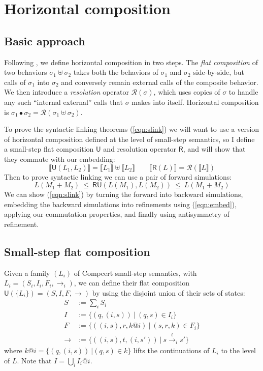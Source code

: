 \documentclass[11pt]{article}
\newcommand{\kw}[1]{{\mathsf{#1}}}
\begin{document}
\section{Horizontal composition}
\label{sec:hcomp}

\subsection{Basic approach}

Following \cite{cpp15},
we define horizontal composition in two steps.
The \emph{flat composition} of two behaviors $\sigma_1 \uplus \sigma_2$
takes both the behaviors of $\sigma_1$ and $\sigma_2$ side-by-side,
but calls of $\sigma_1$ into $\sigma_2$ and conversely remain
external calls of the composite behavior.
We then introduce a \emph{resolution} operator $\mathcal{R}(\sigma)$,
which uses copies of $\sigma$ to handle any such ``internal external'' calls
that $\sigma$ makes into itself.
Horizontal composition is
$\sigma_1 \bullet \sigma_2 = \mathcal{R}(\sigma_1 \uplus \sigma_2)$.

To prove the syntactic linking theorems (\ref{eqn:slink})
we will want to use a version of horizontal composition
defined at the level of small-step semantics,
so I define a small-step flat composition $\kw{U}$
and resolution operator $\kw{R}$,
and will show that they commute with our embedding:
\[
  \llbracket \kw{U}(L_1, L_2) \rrbracket =
    \llbracket L_1 \rrbracket \uplus
    \llbracket L_2 \rrbracket
  \qquad
  \llbracket \kw{R}(L) \rrbracket =
    \mathcal{R}(\llbracket L \rrbracket)
\]
Then to prove syntactic linking we can use a pair of forward simulations:
\[
  L(M_1 + M_2) \ \le\  \kw{R}\kw{U}(L(M_1), L(M_2)) \ \le\  L(M_1 + M_2)
\]
We can show (\ref{eqn:slink}) by
turning the forward into backward simulations,
embedding the backward simulations into refinements using (\ref{eqn:embed}),
applying our commutation properties, and
finally using antisymmetry of refinement.

\subsection{Small-step flat composition}

Given a family $(L_i)$ of Compcert small-step semantics,
with $L_i = (S_i, I_i, F_i, {\rightarrow_i})$,
we can define their flat composition $\kw{U}(\{ L_i \}) = (S, I, F, {\rightarrow})$
by using the disjoint union of their sets of states:
\begin{align*}
  S &:= \sum_i S_i \\
  I &:= \{ (q, (i, s)) \: \vert \: (q, s) \in I_i \} \\
  F &:= \{ ((i, s), r, k@i) \: \vert \: (s, r, k) \in F_i \} \\
  {\rightarrow} &:= \{ ((i, s), t, (i, s')) \: \vert \: s
\stackrel{t}{\rightarrow}_i s' \}
\end{align*}
where $k@i = \{ (q, (i, s)) \: \vert (q, s) \in k \}$
lifts the continuations of $L_i$ to the level of $L$.
Note that $I = \bigcup_i I_i@i$.
\end{document}

